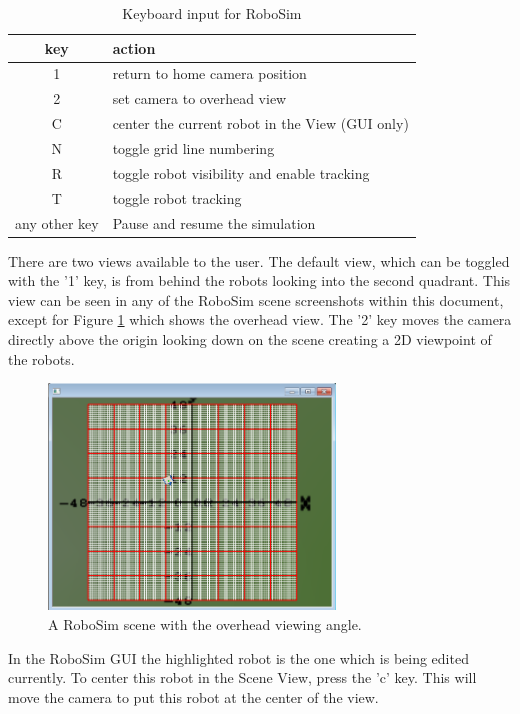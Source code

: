 \documentclass{article}
\begin{document}
\begin{table}[H]
	\begin{center}
	\begin{tabular}{c | l }
		\hline \hline
		\textbf{key} & \textbf{action} \\ \hline
		1 & return to home camera position \\
		2 & set camera to overhead view \\
		C & center the current robot in the View (GUI only) \\
		N & toggle grid line numbering \\
		R & toggle robot visibility and enable tracking \\
		T & toggle robot tracking \\
		any other key & Pause and resume the simulation \\
		\hline \hline
	\end{tabular}
	\caption{Keyboard input for RoboSim}
	\label{tab:keys}
	\end{center}
\end{table}

There are two views available to the user.  The default view, which can be
toggled with the '1' key, is from behind the robots looking into the second
quadrant.  This view can be seen in any of the RoboSim scene screenshots within
this document, except for Figure \ref{fig:robosim_overhead} which shows the
overhead view.  The '2' key moves the camera directly above the origin looking
down on the scene creating a 2D viewpoint of the robots.
\begin{figure}[H]
	\begin{center}
		\includegraphics[width=3in]{pictures/robosim_overhead}
	\end{center}
	\caption{A RoboSim scene with the overhead viewing angle.}
	\label{fig:robosim_overhead}
\end{figure}

In the RoboSim GUI the highlighted robot is the one which is being edited
currently.  To center this robot in the Scene View, press the 'c' key.  This
will move the camera to put this robot at the center of the view.
\end{document}
